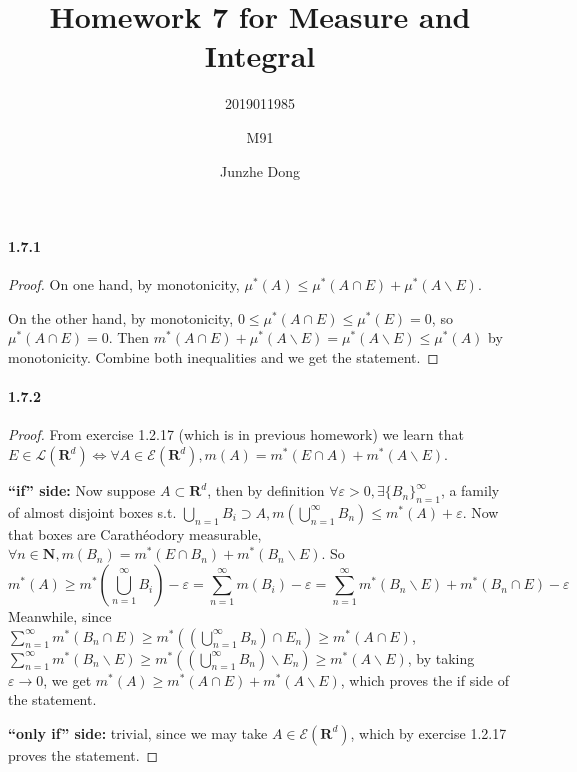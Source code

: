 \documentclass{article}
\author{2019011985\and M91\and Junzhe Dong}
\title{Homework 7 for Measure and Integral}
\begin{document}
\maketitle
\newcommand{\st}{\text{ s.t.}}
\newcommand{\dd}{\,\mathrm{d}}
\newcommand{\du}{\,\mathrm{d} \mu}
\newcommand{\re}{\mathrm{Re}\,}
\newcommand{\im}{\mathrm{Im}\,}
\newcommand{\sip}{\mathrm{Simp}}
\newcommand{\R}{\mathbf{R}^d}
\newcommand{\WLOG}{without loss of generality}
\newcommand{\aeeq}{\stackrel{\mathrm{a.e.}}{=}}
\newcommand{\B}{\mathcal{B}}
\newcommand{\alg}{\mathcal{A}}
\newcommand{\F}{\mathcal{F}}
\newcommand{\Leb}{\mathcal{L}}

\DeclareRobustCommand{\rchi}{{\mathpalette\irchi\relax}}
\newcommand{\irchi}[2]{\raisebox{\depth}{$#1\chi$}} 

\paragraph{1.7.1}
\begin{proof}
On one hand, by monotonicity, $\mu^*(A)\leq \mu^*(A\cap E)+\mu^*(A\backslash E)$.

On the other hand, by monotonicity, $0\leq\mu^*(A\cap E)\leq \mu^*(E)=0$, so $\mu^*(A\cap E)=0$. Then $m^*(A\cap E)+\mu^*(A\backslash E)=\mu^*(A\backslash E)\leq \mu^*(A)$ by monotonicity. Combine both inequalities and we get the statement.
\end{proof}

\paragraph{1.7.2}
\begin{proof}
From exercise 1.2.17 (which is in previous homework) we learn that $E\in\Leb(\R)\Leftrightarrow \forall A\in\mathcal{E}(\R), m(A)=m^*(E\cap A)+m^*(A\backslash E)$. 

\textbf{``if'' side: }Now suppose $A\subset \R$, then by definition $\forall \varepsilon>0, \exists \{B_n\}_{n=1}^{\infty}$, a family of almost disjoint boxes s.t. $\bigcup\limits_{n=1}B_i\supset A, m(\bigcup\limits_{n=1}^\infty B_n)\leq m^*(A)+\varepsilon$. Now that boxes are Carath\'eodory measurable, $\forall n\in \mathbf{N}, m(B_n)=m^*(E\cap B_n)+m^*(B_n\backslash E)$. So 
\[m^*(A)\geq m^*(\bigcup_{n=1}^\infty B_i)-\varepsilon=\sum_{n=1}^\infty m(B_i)-\varepsilon=\sum_{n=1}^\infty m^*(B_n\backslash E)+m^*(B_n\cap E)-\varepsilon\]
Meanwhile, since $\sum\limits_{n=1}^{\infty}m^*(B_n\cap E)\geq m^*((\bigcup\limits_{n=1}^\infty B_n)\cap E_n)\geq m^*(A\cap E)$, $\sum\limits_{n=1}^{\infty}m^*(B_n\backslash E)\geq m^*((\bigcup\limits_{n=1}^\infty B_n)\backslash E_n)\geq m^*(A\backslash E)$, by taking $\varepsilon\to 0$, we get $m^*(A)\geq m^*(A\cap E)+m^*(A\backslash E)$, which proves the if side of the statement.

\textbf{``only if'' side: } trivial, since we may take $A\in\mathcal{E}(\R)$, which by exercise 1.2.17 proves the statement. 
\end{proof}
\end{document}

